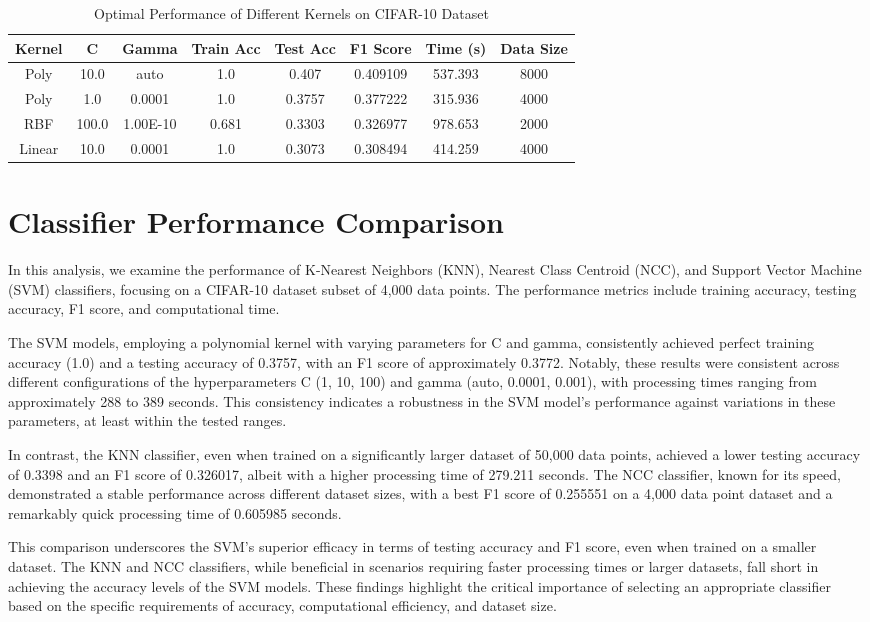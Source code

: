 \documentclass[conference]{IEEEtran}
\begin{document}
\begin{table}[H]
\centering
\caption{Optimal Performance of Different Kernels on CIFAR-10 Dataset}
\begin{tabular}{|c|c|c|c|c|c|c|c|}

\hline
Kernel & C & Gamma & Train Acc & Test Acc & F1 Score & Time (s) & Data Size \\ \hline
Poly & 10.0 & auto & 1.0 & 0.407 & 0.409109 & 537.393 & 8000 \\ \hline
Poly & 1.0 & 0.0001 & 1.0 & 0.3757 & 0.377222 & 315.936 & 4000 \\ \hline
RBF & 100.0 & 1.00E-10 & 0.681 & 0.3303 & 0.326977 & 978.653 & 2000 \\ \hline
Linear & 10.0 & 0.0001 & 1.0 & 0.3073 & 0.308494 & 414.259 & 4000 \\ \hline
\end{tabular}
\end{table}	

\section{Classifier Performance Comparison}

In this analysis, we examine the performance of K-Nearest Neighbors (KNN), Nearest Class Centroid (NCC), and Support Vector Machine (SVM) classifiers, focusing on a CIFAR-10 dataset subset of 4,000 data points. The performance metrics include training accuracy, testing accuracy, F1 score, and computational time.

The SVM models, employing a polynomial kernel with varying parameters for C and gamma, consistently achieved perfect training accuracy (1.0) and a testing accuracy of 0.3757, with an F1 score of approximately 0.3772. Notably, these results were consistent across different configurations of the hyperparameters C (1, 10, 100) and gamma (auto, 0.0001, 0.001), with processing times ranging from approximately 288 to 389 seconds. This consistency indicates a robustness in the SVM model's performance against variations in these parameters, at least within the tested ranges.

In contrast, the KNN classifier, even when trained on a significantly larger dataset of 50,000 data points, achieved a lower testing accuracy of 0.3398 and an F1 score of 0.326017, albeit with a higher processing time of 279.211 seconds. The NCC classifier, known for its speed, demonstrated a stable performance across different dataset sizes, with a best F1 score of 0.255551 on a 4,000 data point dataset and a remarkably quick processing time of 0.605985 seconds.

This comparison underscores the SVM's superior efficacy in terms of testing accuracy and F1 score, even when trained on a smaller dataset. The KNN and NCC classifiers, while beneficial in scenarios requiring faster processing times or larger datasets, fall short in achieving the accuracy levels of the SVM models. These findings highlight the critical importance of selecting an appropriate classifier based on the specific requirements of accuracy, computational efficiency, and dataset size.
\end{document}
